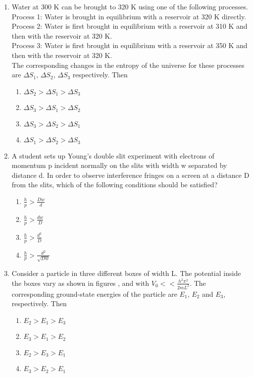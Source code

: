 \documentclass[journal,12pt,onecolumn]{IEEEtran}
\theoremstyle{remark}
\begin{document}
\begin{enumerate}
\item Water at 300 K can be brought to 320 K using one of the following processes.\\
Process 1: Water is brought in equilibrium with a reservoir at 320 K directly.\\
Process 2: Water is first brought in equilibrium with a reservoir at 310 K and then with the reservoir at 320 K.\\
Process 3: Water is first brought in equilibrium with a reservoir at 350 K and then with the reservoir at 320 K.\\
The corresponding changes in the entropy of the universe for these processes are $\Delta S_1$, $\Delta S_2$, $\Delta S_3$ respectively. Then 
\begin{enumerate}
    \item $\Delta S_2 > \Delta S_1 > \Delta S_3$
    \item $\Delta S_3 > \Delta S_1 > \Delta S_2$
    \item $\Delta S_3 > \Delta S_2 > \Delta S_1$
    \item $\Delta S_1 > \Delta S_2 > \Delta S_3$
\end{enumerate}

\item A student sets up Young's double slit experiment with electrons of momentum p incident normally on the slits with width w separated by distance d. In order to observe interference fringes on a screen at a distance D from the slits, which of the following conditions should be satisfied?
\begin{enumerate}
    \item $\frac{h}{p} > \frac{Dw}{d}$
    \item $\frac{h}{p} > \frac{dw}{D}$
    \item $\frac{h}{p} > \frac{d^2}{D}$
    \item $\frac{h}{p} > \frac{d^2}{\sqrt{Dw}}$
\end{enumerate}

\item Consider a particle in three different boxes of width L. The potential inside the boxes vary as shown in figures ,  and  with $V_0 << \frac{h^2 \pi ^2}{2m L^2}$. The corresponding ground-state energies of the particle are $E_1$, $E_2$ and $E_3$, respectively. Then
\begin{figure}[!ht]
\centering
\resizebox{0.5\textwidth}{!}{%

}%
\end{figure}
\begin{enumerate}
    \item $E_2 > E_1 > E_3$
    \item $E_3 > E_1 > E_2$
    \item $E_2 > E_3 > E_1$
    \item $E_3 > E_2 > E_1$
\end{enumerate}



\end{enumerate}
\end{document}
